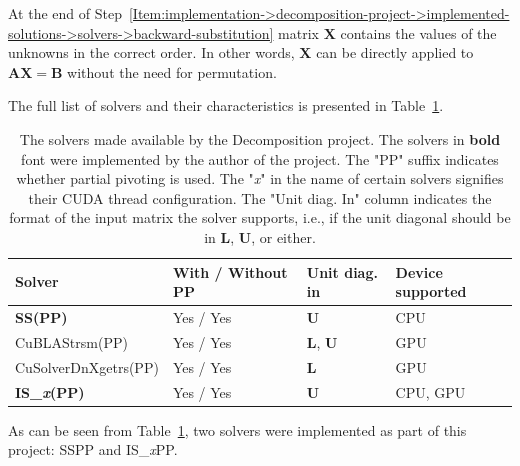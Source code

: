 At the end of Step~\ref{Item:implementation->decomposition-project->implemented-solutions->solvers->backward-substitution} matrix $\mathbf{X}$ contains the values of the unknowns in the correct order.
In other words, $\mathbf{X}$ can be directly applied to $\mathbf{AX} = \mathbf{B}$ without the need for permutation.

The full list of solvers and their characteristics is presented in Table~\ref{Table:implementation->decomposition-project->implemented-solutions->solvers->solvers-in-the-project}.

\begin{table}[!ht]
	\centering
	\begin{tabular}{|l|l|l|l|}
		\hline
		\rowcolor[HTML]{C0C0C0}\textbf{Solver}              & \textbf{With / Without PP} & \textbf{Unit diag. in}     & \textbf{Device supported} \\ \hline
		\cellcolor[HTML]{EFEFEF}\textbf{SS(PP)}             & Yes / Yes                  & $\mathbf{U}$               & CPU                       \\
		\cellcolor[HTML]{EFEFEF}CuBLAStrsm(PP)              & Yes / Yes                  & $\mathbf{L}$, $\mathbf{U}$ & GPU                       \\
		\cellcolor[HTML]{EFEFEF}CuSolverDnXgetrs(PP)        & Yes / Yes                  & $\mathbf{L}$               & GPU                       \\
		\cellcolor[HTML]{EFEFEF}\textbf{IS\_\textit{x}(PP)} & Yes / Yes                  & $\mathbf{U}$               & CPU, GPU                  \\ \hline
	\end{tabular}
	\caption{The solvers made available by the Decomposition project.
		The solvers in \textbf{bold} font were implemented by the author of the project.
		The "PP" suffix indicates whether partial pivoting is used.
		The "\textit{x}" in the name of certain solvers signifies their CUDA thread configuration.
		The "Unit diag. In" column indicates the format of the input matrix the solver supports, i.e., if the unit diagonal should be in $\mathbf{L}$, $\mathbf{U}$, or either.
	}
	\label{Table:implementation->decomposition-project->implemented-solutions->solvers->solvers-in-the-project}
\end{table}

As can be seen from Table~\ref{Table:implementation->decomposition-project->implemented-solutions->solvers->solvers-in-the-project}, two solvers were implemented as part of this project: SSPP and IS\_\textit{x}PP.

